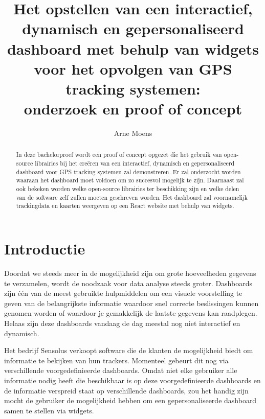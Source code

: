 \documentclass{hogent-article}
\title{Het opstellen van een interactief, dynamisch en
    gepersonaliseerd dashboard met behulp van widgets voor het opvolgen van GPS tracking systemen: \\
    onderzoek en proof of concept}
\author{Arne Moens}
\begin{document}
    
    \begin{abstract}
        In deze bachelorproef wordt een proof of concept opgezet die het gebruik van open-source librairies bij het creëren van een interactief, dynamisch en gepersonaliseerd dashboard voor GPS tracking systemen zal demonstreren. Er zal onderzocht worden waaraan het dashboard moet voldoen om zo succesvol mogelijk te zijn. Daarnaast zal ook bekeken worden welke open-source librairies ter beschikking zijn en welke delen van de software zelf  zullen moeten geschreven worden. Het dashboard zal voornamelijk trackingdata en kaarten weergeven op een React website met behulp van widgets.
    \end{abstract}
    
    \tableofcontents
    
    
    \section{Introductie}%
    \label{sec:introductie}
    
    Doordat we steeds meer in de mogelijkheid zijn om grote hoeveelheden gegevens te verzamelen, wordt de noodzaak voor data analyse steeds groter. Dashboards zijn één van de meest gebruikte hulpmiddelen om een visuele voorstelling te geven van de belangrijkste informatie waardoor snel correcte beslissingen kunnen genomen worden of waardoor je gemakkelijk de laatste gegevens kan raadplegen. 
    Helaas zijn deze dashboards vandaag de dag meestal nog niet interactief en dynamisch. 
    
    
    Het bedrijf Sensolus verkoopt software die de klanten de mogelijkheid biedt om informatie te bekijken van hun trackers. Momenteel gebeurt dit nog via verschillende voorgedefinieerde dashboards.
    Omdat niet elke gebruiker alle informatie nodig heeft die beschikbaar is op deze voorgedefinieerde dashboards en de informatie verspreid staat op verschillende dashboards, zou het handig zijn mocht de gebruiker de mogelijkheid hebben om een gepersonaliseerde dashboard samen te stellen via widgets.
    
\end{document}
